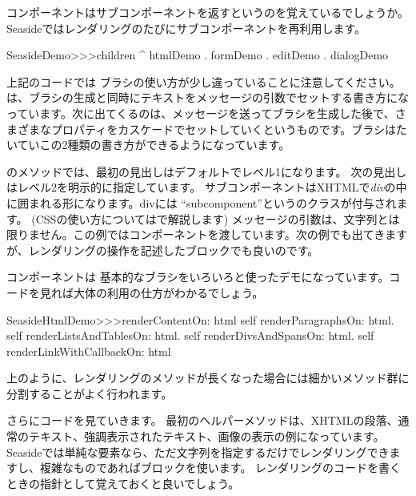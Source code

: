 \documentclass[a4paper,10pt,twoside]{book}
\begin{document}
\noindent
コンポーネントはサブコンポーネントを返すというのを覚えているでしょうか。Seasideではレンダリングのたびにサブコンポーネントを再利用します。
\begin{code}{}
SeasideDemo>>>children
	^ { htmlDemo . formDemo . editDemo . dialogDemo }
\end{code}

上記のコードでは  ブラシの使い方が少し違っていることに注意してください。は、ブラシの生成と同時にテキストをメッセージの引数でセットする書き方になっています。次に出てくるのは、メッセージを送ってブラシを生成した後で、さまざまなプロパティをカスケードでセットしていくというものです。ブラシはたいていこの2種類の書き方ができるようになっています。


のメソッドでは、最初の見出しはデフォルトでレベル1になります。
次の見出しはレベル2を明示的に指定しています。
サブコンポーネントはXHTMLで\emph{div}の中に囲まれる形になります。divには ``subcomponent''というのクラスが付与されます。
(CSSの使い方についてはで解説します)
 メッセージの引数は、文字列とは限りません。この例ではコンポーネントを渡しています。次の例でも出てきますが、レンダリングの操作を記述したブロックでも良いのです。

コンポーネントは 基本的なブラシをいろいろと使ったデモになっています。コードを見れば大体の利用の仕方がわかるでしょう。

\begin{code}{}
SeasideHtmlDemo>>>renderContentOn: html 
	self renderParagraphsOn: html.
	self renderListsAndTablesOn: html.
	self renderDivsAndSpansOn: html.
	self renderLinkWithCallbackOn: html
\end{code}

上のように、レンダリングのメソッドが長くなった場合には細かいメソッド群に分割することがよく行われます。


さらにコードを見ていきます。
最初のヘルパーメソッドは、XHTMLの段落、通常のテキスト、強調表示されたテキスト、画像の表示の例になっています。
Seasideでは単純な要素なら、ただ文字列を指定するだけでレンダリングできますし、複雑なものであればブロックを使います。
レンダリングのコードを書くときの指針として覚えておくと良いでしょう。
\end{document}
